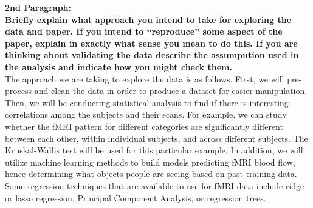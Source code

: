 \documentclass[11pt]{article}
\begin{document}
\textbf{\underline{2nd Paragraph:}} \\
\textbf{Briefly explain what approach you intend to take for exploring
the data and paper.  If you intend to ``reproduce'' some aspect of the paper,
explain in exactly what sense you mean to do this.  If you are thinking about
validating the data describe the assumpution used in the analysis and indicate
how you might check them.}\\

The approach we are taking to explore the data is as follows. First, we will
pre-process and clean the data in order to produce a dataset for easier
manipulation. Then, we will be conducting statistical analysis to find if there
is interesting correlations among the subjects and their scans. For example,
we can study whether the fMRI pattern for different categories are
significantly different between each other, within individual subjects, and
across different subjects. The Kruskal-Wallis test will be used for this
particular example. In addition, we will utilize machine learning methods to
build models predicting fMRI blood flow, hence determining what objects people
are seeing based on past training data. Some regression techniques that are
available to use for fMRI data include ridge or lasso regression, Principal
Component Analysis, or regression trees.


\end{document}
